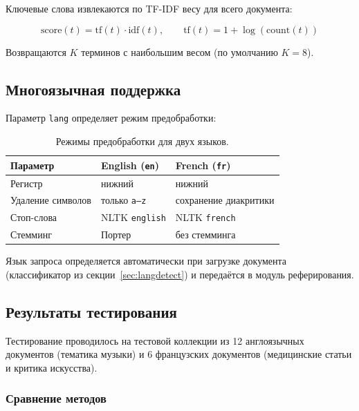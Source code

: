 Ключевые слова извлекаются по TF-IDF весу для всего документа:

\begin{equation}
	\text{score}(t) = \text{tf}(t) \cdot \text{idf}(t), \qquad
	\text{tf}(t) = 1 + \log(\text{count}(t))
	\label{eq:kw_score}
\end{equation}

Возвращаются $K$ терминов с наибольшим весом (по умолчанию $K = 8$).

\subsection{Многоязычная поддержка}

Параметр \texttt{lang} определяет режим предобработки:

\begin{table}[H]
	\centering
	\begin{tabular}{|p{3cm}|p{5cm}|p{5cm}|}
		\hline
		\textbf{Параметр} & \textbf{English (\texttt{en})} & \textbf{French (\texttt{fr})} \\
		\hline
		Регистр & нижний & нижний \\
		\hline
		Удаление символов & только \texttt{a--z} & сохранение диакритики \\
		\hline
		Стоп-слова & NLTK \texttt{english} & NLTK \texttt{french} \\
		\hline
		Стемминг & Портер & без стемминга \\
		\hline
	\end{tabular}
	\caption{Режимы предобработки для двух языков.}
	\label{tab:summary_lang}
\end{table}

Язык запроса определяется автоматически при загрузке документа
(классификатор из секции~\ref{sec:langdetect}) и передаётся
в модуль реферирования.

\subsection{Результаты тестирования}

Тестирование проводилось на тестовой коллекции из 12 англоязычных
документов (тематика музыки) и 6 французских документов (медицинские
статьи и критика искусства).

\subsubsection{Сравнение методов}

